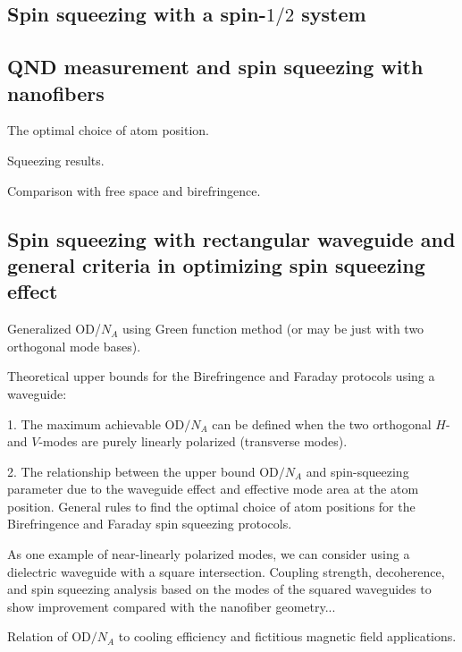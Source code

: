 \documentclass[preprint,aps,pra,onecolumn,superscriptaddress]{revtex4-1} %
\begin{document}
\subsection{Spin squeezing with a spin-$1/2$ system} \label{Sec::squeezingwithspinhalfsystems}


\subsection{QND measurement and spin squeezing with nanofibers} \label{Sec::Nanofiber}

The optimal choice of atom position.

Squeezing results.

Comparison with free space and birefringence.


\subsection{Spin squeezing with rectangular waveguide and general criteria in optimizing spin squeezing effect} \label{Sec::Waveguide}

Generalized OD/$N_A$ using Green function method (or may be just with two orthogonal mode bases).

Theoretical upper bounds for the Birefringence and Faraday protocols using a waveguide:

1. The maximum achievable OD$ /N_A $ can be defined when the two orthogonal $ H $- and $ V $-modes are purely linearly polarized (transverse modes).

2. The relationship between the upper bound OD$ /N_A $ and spin-squeezing parameter due to the waveguide effect and effective mode area at the atom position. 
General rules to find the optimal choice of atom positions for the Birefringence and Faraday spin squeezing protocols.


As one example of near-linearly polarized modes, we can consider using a dielectric waveguide with a square intersection. 
Coupling strength, decoherence, and spin squeezing analysis based on the modes of the squared waveguides to show improvement compared with the nanofiber geometry...

Relation of OD$ /N_A $ to cooling efficiency and fictitious magnetic field applications.
\end{document}
